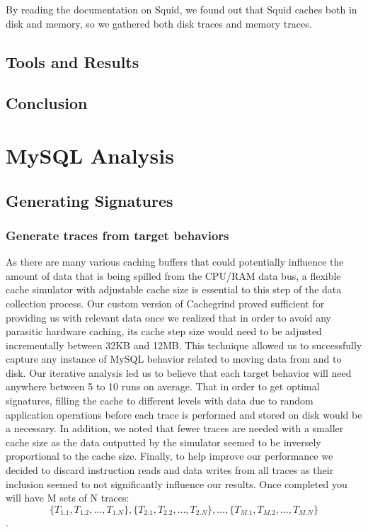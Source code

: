 \documentclass[11pt, oneside]{article}
\begin{document}
By reading the documentation on Squid, we found out that Squid caches both in 
disk and memory, so we gathered both disk traces and memory traces.

\subsection{Tools and Results}

\subsection{Conclusion}

\section{MySQL Analysis}

\subsection{Generating Signatures}
\subsubsection{Generate traces from target behaviors}
As there are many various caching buffers that could potentially influence the 
amount of data that is being spilled from the CPU/RAM data bus, a flexible 
cache simulator with adjustable cache size is essential to this step of the 
data collection process. Our custom version of Cachegrind proved sufficient 
for providing us with relevant data once we realized that in order to avoid 
any parasitic hardware caching, its cache step size would need to be adjusted 
incrementally between 32KB and 12MB. This technique allowed us to successfully 
capture any instance of MySQL behavior related to moving data from and to 
disk.  Our iterative analysis led us to believe that each target behavior will 
need anywhere between 5 to 10 runs on average. That in order to get optimal 
signatures, filling the cache to different levels with data due to random 
application operations before each trace is performed and stored on disk would 
be a necessary. In addition, we noted that fewer traces are needed with a 
smaller cache size as the data outputted by the simulator seemed to be 
inversely proportional to the cache size. Finally, to help improve our 
performance we decided to discard instruction reads and data writes from all 
traces as their inclusion seemed to not significantly influence our results.
Once completed you will have M sets of N traces:
$$\{T_{1.1}, T_{1.2}, \ldots, T_{1.N}\}, 
  \{T_{2.1}, T_{2.2}, \ldots, T_{2.N}\},
  \ldots,
  \{T_{M.1}, T_{M.2}, \ldots, T_{M.N}\}$$.
\end{document}
